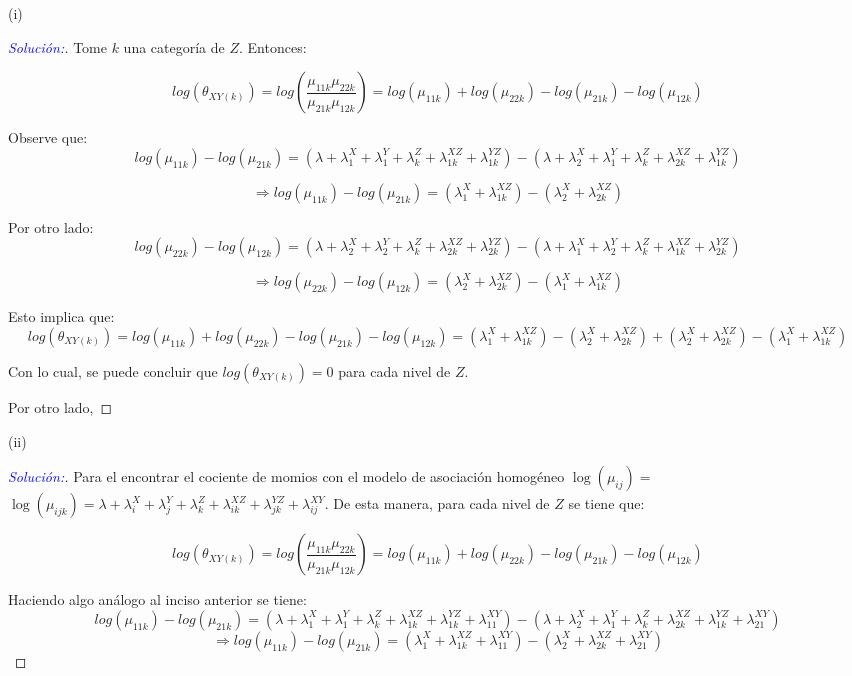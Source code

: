 \documentclass[12pt,a4paper,oneside]{article}
\begin{document}
\begin{compactenum}
	\item[(i)] \begin{proof}[\textcolor{blue}{Solución:}] Tome $k$ una categoría de $Z$. Entonces:

$$log(\theta_{XY(k)}) = log\left(\dfrac{\mu_{11k} \mu_{22k}}{\mu_{21k}\mu_{12k}}\right) = log(\mu_{11k})+log(\mu_{22k})-log(\mu_{21k})-log(\mu_{12k})$$

Observe que:
$$log(\mu_{11k}) -  log(\mu_{21k}) = (\lambda + \lambda_1^X + \lambda_1^Y + \lambda_k^Z + \lambda_{1k}^{XZ} + \lambda_{1k}^{YZ}) - (\lambda + \lambda_2^X + \lambda_1^Y + \lambda_k^Z + \lambda_{2k}^{XZ} + \lambda_{1k}^{YZ})$$

$$\Rightarrow log(\mu_{11k}) -  log(\mu_{21k}) = (\lambda_1^X + \lambda_{1k}^{XZ}) - (\lambda_2^X + \lambda_{2k}^{XZ})$$

Por otro lado:
$$log(\mu_{22k}) -  log(\mu_{12k}) = (\lambda + \lambda_2^X + \lambda_2^Y + \lambda_k^Z + \lambda_{2k}^{XZ} + \lambda_{2k}^{YZ}) - (\lambda + \lambda_1^X + \lambda_2^Y + \lambda_k^Z + \lambda_{1k}^{XZ} + \lambda_{2k}^{YZ})$$

$$\Rightarrow log(\mu_{22k}) -  log(\mu_{12k}) = (\lambda_2^X + \lambda_{2k}^{XZ}) - (\lambda_1^X + \lambda_{1k}^{XZ})$$

Esto implica que:
$$log(\theta_{XY(k)}) = log(\mu_{11k})+log(\mu_{22k})-log(\mu_{21k})-log(\mu_{12k}) = (\lambda_1^X + \lambda_{1k}^{XZ}) - (\lambda_2^X + \lambda_{2k}^{XZ}) + (\lambda_2^X + \lambda_{2k}^{XZ}) - (\lambda_1^X + \lambda_{1k}^{XZ})$$

Con lo cual, se puede concluir que $log(\theta_{XY(k)}) = 0$ para cada nivel de $Z$.

Por otro lado,
	\end{proof}
	
	\item[(ii)] \begin{proof}[\textcolor{blue}{Solución:}] Para el encontrar el cociente de momios con el modelo de asociación homogéneo $\log(\mu_{ij}) =  $ $\log(\mu_{ijk}) = \lambda + \lambda_i^X + \lambda_j^Y + \lambda_k^Z + \lambda_{ik}^{XZ} + \lambda_{jk}^{YZ} + \lambda_{ij}^{XY}$. De esta manera, para cada nivel de $Z$ se tiene que:
	
	$$log(\theta_{XY(k)}) = log\left(\dfrac{\mu_{11k} \mu_{22k}}{\mu_{21k}\mu_{12k}}\right) = log(\mu_{11k})+log(\mu_{22k})-log(\mu_{21k})-log(\mu_{12k})$$
	
	Haciendo algo análogo al inciso anterior se tiene:
$$log(\mu_{11k}) -  log(\mu_{21k}) = (\lambda + \lambda_1^X + \lambda_1^Y + \lambda_k^Z + \lambda_{1k}^{XZ} + \lambda_{1k}^{YZ} + \lambda_{11}^{XY}) - (\lambda + \lambda_2^X + \lambda_1^Y + \lambda_k^Z + \lambda_{2k}^{XZ} + \lambda_{1k}^{YZ} + \lambda_{21}^{XY})$$
$$\Rightarrow log(\mu_{11k}) -  log(\mu_{21k}) = (\lambda_1^X + \lambda_{1k}^{XZ} + \lambda_{11}^{XY}) - (\lambda_2^X + \lambda_{2k}^{XZ} + \lambda_{21}^{XY})$$


\end{proof}
\end{compactenum}
\end{document}
